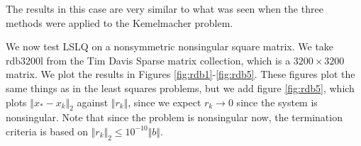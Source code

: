 \documentclass[11pt]{article}
\begin{document}
The results in this case are very similar to what was seen when the three methods were applied to the Kemelmacher problem.

We now test LSLQ on a nonsymmetric nonsingular square matrix. We take rdb3200l from the Tim Davis Sparse matrix collection, which is a $3200 \times 3200$ matrix. We plot the results in Figures \ref{fig:rdb1}-\ref{fig:rdb5}. These figures plot the same things as in the least squares problems, but we add figure \ref{fig:rdb5}, which plots $\Vert x_* - x_k \Vert_2$ against $\Vert r_k \Vert$, since we expect $r_k \rightarrow 0$ since the system is nonsingular. Note that since the problem is nonsingular now, the termination criteria is based on $\Vert r_k \Vert_2 \leq 10^{-10} \Vert b \Vert$.

\begin{figure}[ht]
\centering
	\hfill
	
	\hfill
	

\end{figure}
\end{document}
